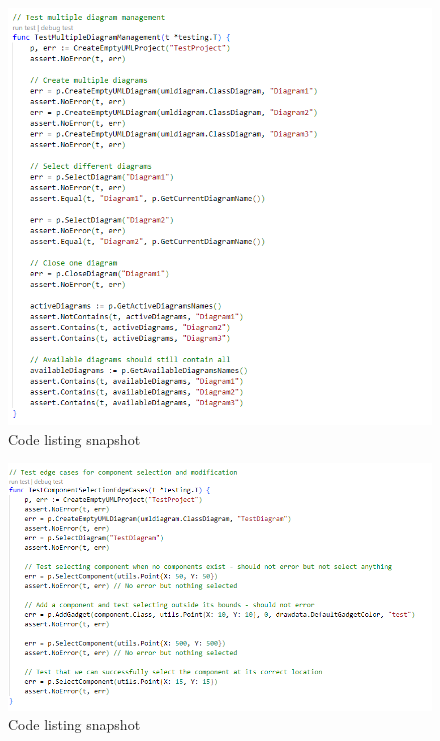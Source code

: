 \documentclass[12pt]{article}
\begin{document}
    \begin{figure}[H]
        \begin{center}
            \includegraphics[width=0.95\linewidth]
            {assets/hw7/test2.png}
            \caption{Code listing snapshot}
        \end{center}
    \end{figure}
    \begin{figure}[H]
        \begin{center}
            \includegraphics[width=0.95\linewidth]
            {assets/hw7/test3.png}
            \caption{Code listing snapshot}
        \end{center}
    \end{figure}
\end{document}

